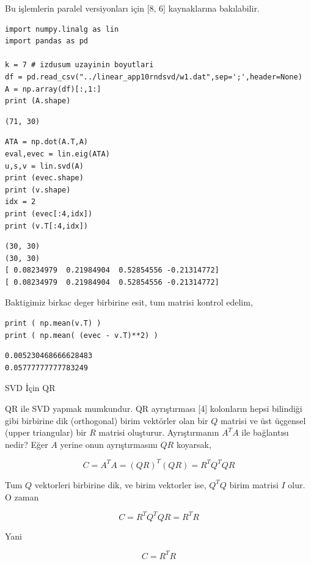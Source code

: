 \documentclass[12pt,fleqn]{article}\usepackage{../../common}
\begin{document}
Bu işlemlerin paralel versiyonları için [8, 6] kaynaklarına bakılabilir.


\begin{verbatim}
import numpy.linalg as lin
import pandas as pd

k = 7 # izdusum uzayinin boyutlari
df = pd.read_csv("../linear_app10rndsvd/w1.dat",sep=';',header=None)
A = np.array(df)[:,1:]
print (A.shape)
\end{verbatim}

\begin{verbatim}
(71, 30)
\end{verbatim}

\begin{verbatim}
ATA = np.dot(A.T,A)
eval,evec = lin.eig(ATA)
u,s,v = lin.svd(A)
print (evec.shape)
print (v.shape)
idx = 2
print (evec[:4,idx])
print (v.T[:4,idx])
\end{verbatim}

\begin{verbatim}
(30, 30)
(30, 30)
[ 0.08234979  0.21984904  0.52854556 -0.21314772]
[ 0.08234979  0.21984904  0.52854556 -0.21314772]
\end{verbatim}

Baktigimiz birkac deger birbirine esit, tum matrisi kontrol edelim,

\begin{verbatim}
print ( np.mean(v.T) )
print ( np.mean( (evec - v.T)**2) )
\end{verbatim}

\begin{verbatim}
0.005230468666628483
0.05777777777783249
\end{verbatim}

SVD İçin QR

QR ile SVD yapmak mumkundur. QR ayrıştırması [4] kolonların hepsi bilindiği gibi
birbirine dik (orthogonal) birim vektörler olan bir $Q$ matrisi ve üst üçgensel
(upper triangular) bir $R$ matrisi oluşturur. Ayrıştırmanın $A^TA$ ile
bağlantısı nedir? Eğer $A$ yerine onun ayrıştırmasını $QR$ koyarsak,

$$
C = A^TA = (QR)^T (QR) = R^T Q^T QR
$$

Tum $Q$ vektorleri birbirine dik, ve birim vektorler ise, $Q^T Q$
birim matrisi $I$ olur. O zaman

$$
C = R^T Q^T QR = R^T R
$$

Yani

$$
C = R^TR
$$
\end{document}
